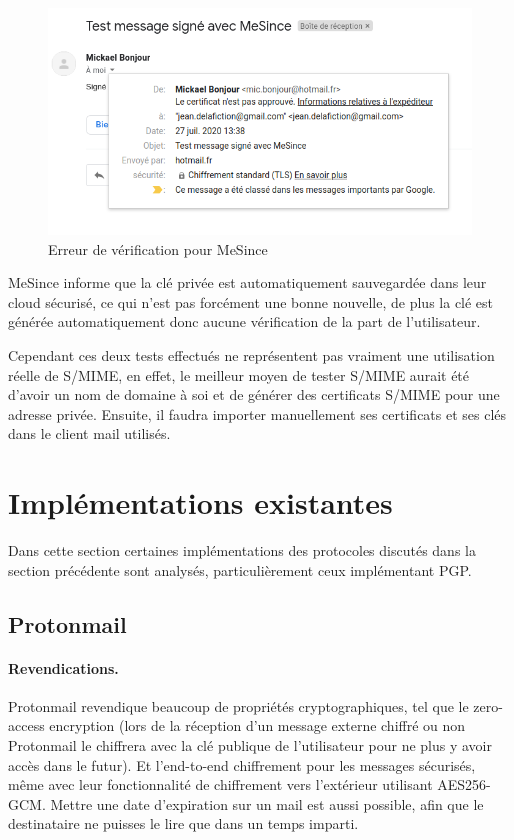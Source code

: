 \begin{figure}[h!]
	\includegraphics[width=15cm]{images/mesince_problem.png}
	\centering
	\caption{Erreur de vérification pour MeSince}
	\label{fig:SMIME_MeSinceProblem}
\end{figure}

MeSince informe que la clé privée est automatiquement sauvegardée dans leur cloud sécurisé, ce qui n'est pas forcément une bonne nouvelle, de plus la clé est générée automatiquement donc aucune vérification de la part de l'utilisateur.

Cependant ces deux tests effectués ne représentent pas vraiment une utilisation réelle de S/MIME, en effet, le meilleur moyen de tester S/MIME aurait été d'avoir un nom de domaine à soi et de générer des certificats S/MIME pour une adresse privée. Ensuite, il faudra importer manuellement ses certificats et ses clés dans le client mail utilisés.
\section{Implémentations existantes}
Dans cette section certaines implémentations des protocoles discutés dans la section précédente sont analysés, particulièrement ceux implémentant PGP.
\subsection{Protonmail}
\paragraph*{Revendications.}
Protonmail revendique beaucoup de propriétés cryptographiques, tel que le zero-access encryption (lors de la réception d'un message externe chiffré ou non Protonmail le chiffrera avec la clé publique de l'utilisateur pour ne plus y avoir accès dans le futur). Et l’end-to-end chiffrement pour les messages sécurisés, même avec leur fonctionnalité de chiffrement vers l'extérieur utilisant AES256-GCM. Mettre une date d'expiration sur un mail est aussi possible, afin que le destinataire ne puisses le lire que dans un temps imparti.

